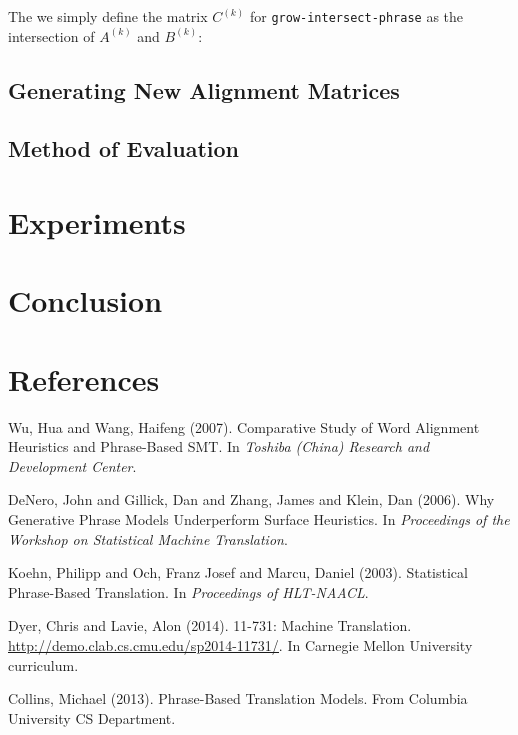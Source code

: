 \documentclass[twocolumn]{article}
\newcommand{\phraseIntersectAlign}{\texttt{grow-intersect-phrase}}
\begin{document}
The we simply define the matrix $C^{(k)}$ for \phraseIntersectAlign{}
as the intersection of $A^{(k)}$ and $B^{(k)}$:
\wrapSmall{\intersectMatrix{}}

\subsection{Generating New Alignment Matrices}


\subsection{Method of Evaluation}


\section{Experiments}


\section{Conclusion}


\section*{References}
\begin{thebibliography}{99}
    Wu, Hua and Wang, Haifeng
    (2007).
    Comparative Study of Word Alignment Heuristics and Phrase-Based SMT.
    In \emph{Toshiba (China) Research and
      Development Center}.

    DeNero, John and Gillick, Dan and Zhang, James and Klein, Dan
    (2006).
    Why Generative Phrase Models Underperform Surface Heuristics.
    In \emph{Proceedings of the Workshop on Statistical Machine Translation}.

    Koehn, Philipp and Och, Franz Josef and Marcu, Daniel
    (2003).
    Statistical Phrase-Based Translation.
    In \emph{Proceedings of HLT-NAACL}.

    Dyer, Chris and Lavie, Alon
    (2014).
    11-731: Machine Translation.
    \href{http://demo.clab.cs.cmu.edu/sp2014-11731/}
     {\underline{http://demo.clab.cs.cmu.edu/sp2014-11731/}}.
    In Carnegie Mellon University curriculum.

    Collins, Michael
    (2013).
    Phrase-Based Translation Models.
    From Columbia University CS Department.
\end{thebibliography}
\end{document}
